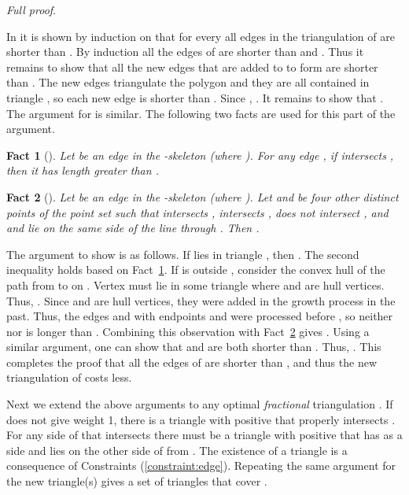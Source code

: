 \documentclass[final]{siamltex}
\newtheorem{fact}{Fact}[theorem]
\newenvironment{fullproof}{\par{\it Full proof}. \ignorespaces}{\endproof}
\begin{document}
\begin{fullproof}
\begin{window}
\hspace*{\parindent}
In \cite{keil1994computing,cheng1996approaching} it is shown by induction on  that 
for every  all edges in the triangulation of  are shorter than .
By induction all the edges of  are shorter than  
and . Thus it remains to show that all the new edges that are added to  to 
form  are shorter than . The new edges triangulate the polygon  
and they are all contained in triangle , so each new edge is shorter than .
Since , . It remains to show that .                                     
The argument for  is similar.
The following two facts are used for this part of the argument.  
\end{window}


\begin{fact}[{\cite[Lemma 2]{keil1994computing}}]\label{prop:length}
Let  be an edge in the -skeleton (where ). 
For any edge , if  intersects , then it has length  greater than 
.
\end{fact}

\begin{fact}[{\cite[Remote Length Lemma]{cheng1996approaching}}]
\label{prop:remote}
Let  be an edge in the -skeleton (where ).
Let  and  be four other distinct points of the point set 
such that  intersects ,  intersects ,  
does not intersect , and  and  lie on the same side of the line through . 
Then .
\end{fact}

The argument to show  is as follows.
If  lies in triangle , then
.
The second inequality holds based on Fact~\ref{prop:length}.
If  is outside , consider the convex hull of the path from 
 to  on . 
Vertex  must lie in some triangle  where  and  are hull vertices. Thus, 
. Since  and  are hull vertices, 
they were added in the growth process in the past. Thus, the edges  and  with endpoints 
 and  were processed before , so neither  nor  is longer
than . Combining this observation with Fact~\ref{prop:remote} gives . 
Using a similar argument, one can show that  and  are both shorter than . 
Thus, . This completes the proof that 
all the edges of  are shorter than , and thus the new triangulation of  costs less.

Next we extend the above arguments to any optimal {\em fractional} triangulation . 
If  does not give  weight 1,
there is a triangle  with positive  that properly intersects .
For any side  of  that intersects  there must be a triangle  
with positive  that has  as a side and lies on the other side of  from . 
The existence of a triangle  is a consequence of Constraints (\ref{constraint:edge}). 
Repeating the same argument for the new triangle(s) gives a set of triangles that cover . 


\end{fullproof}
\end{document}
